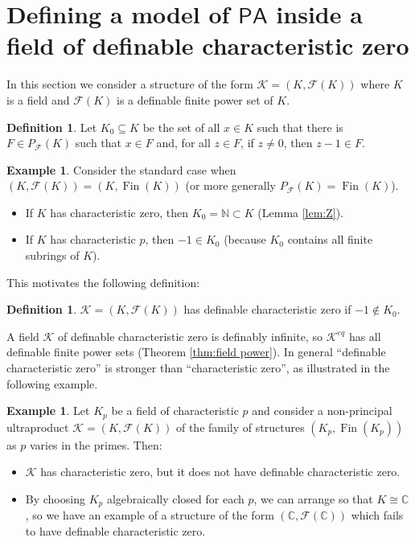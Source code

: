 \documentclass{amsart}
\newcommand{\C}{\mathbb C}
\newcommand{\N}{\mathbb N}
\newcommand{\ca}{\mathcal}
\newcommand{\Fin}{\operatorname{Fin}}
\newcommand{\nin}{\not \in}
\theoremstyle{plain}
\theoremstyle{definition}
\newtheorem{defn}[thm]{Definition}
\newtheorem{exa}[thm]{Example}
\newcommand{\F}{\mathcal{F}}
\newcommand{\pF}{P_{\ca F}}
\newcommand{\PA}{\mathsf{PA}}
\begin{document}
\section{Defining a model of $\PA$ inside a field of definable characteristic zero}\label{sec:PA}

In this section we consider a structure of the form $\mathcal K = (K,\F(K))$ where $K$ is a field and $\F(K)$ is a definable finite power set of $K$. 

\begin{defn} \label{defn:K0} 
Let $K_0 \subseteq K$ be the set of all $x\in K$ such that there is $F\in \pF (K)$ such that $x\in F$ and, for all $z\in F$, if $z\neq 0$, then $z-1 \in F.$ 
\end{defn}

\begin{exa} Consider the standard case when $(K, \F(K))= (K, \Fin(K))$ (or more generally $\pF(K) = \Fin(K)$). 
\begin{itemize}
\item If $K$ has characteristic zero, then $K_0 = \N\subset K$ (Lemma \ref{lem:Z}). 
\item If $K$ has characteristic $p$, then $-1 \in K_0$ (because $K_0$ contains all finite subrings of $K$). 
\end{itemize}
\end{exa}

This motivates the following definition: 

\begin{defn} \label{defn:char zero} $\ca K = (K, \F(K))$ has definable characteristic zero if $-1\nin K_0$. 
\end{defn}

A field $\ca K$ of definable characteristic zero is definably infinite, so $\ca K^{eq}$ has all definable finite power sets (Theorem \ref{thm:field power}). 
In general ``definable characteristic zero'' is stronger than ``characteristic zero'', as illustrated in the following example. 

\begin{exa} \label{exa:Fp} Let $K_p$ be a field of characteristic $p$ and consider a non-principal ultraproduct $\ca K = (K, \F(K))$ of the family of structures $(K_p, \Fin(K_p))$ as $p$ varies in the primes. Then: 
\begin{itemize}
\item 
 $\ca K$ has characteristic zero, but it does not have definable characteristic zero. 
\item 
By choosing $K_p$ algebraically closed for each $p$, we can arrange so that $K \cong \C$, so we have an example of a structure of the form $(\C, \F(\C))$ which fails to have definable characteristic zero.
\end{itemize} 
\end{exa}
 
\end{document}
